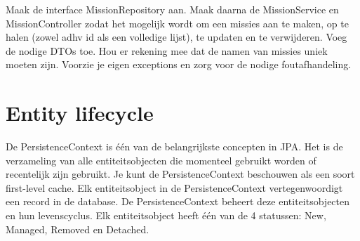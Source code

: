 \begin{oefening}
Maak de interface MissionRepository aan. Maak daarna de MissionService en MissionController zodat het mogelijk wordt om een missies aan te maken, op te halen (zowel adhv id als een volledige lijst), te updaten en te verwijderen.  Voeg de nodige DTOs toe. Hou er rekening mee dat de namen van missies uniek moeten zijn. Voorzie je eigen exceptions en zorg voor de nodige foutafhandeling.


\end{oefening}


\section{Entity lifecycle}


De PersistenceContext is \'e\'en van de belangrijkste concepten in JPA. Het is de verzameling van alle entiteitsobjecten die momenteel gebruikt worden of recentelijk zijn gebruikt. Je kunt de PersistenceContext beschouwen als een soort first-level cache. Elk entiteitsobject in de PersistenceContext vertegenwoordigt een record in de database. De PersistenceContext beheert deze entiteitsobjecten en hun levenscyclus. Elk entiteitsobject heeft \'e\'en van de 4 statussen: New,  Managed, Removed en Detached.


